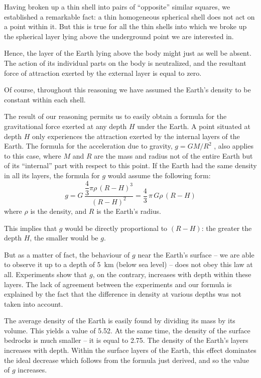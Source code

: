 Having broken up a thin shell into pairs of ``opposite''
similar squares, we established a remarkable fact: a thin
homogeneous spherical shell does not act on a point
within it. But this is true for all the thin shells into which
we broke up the spherical layer lying above the underground point we are interested in.

Hence, the layer of the Earth lying above the body
might just as well be absent. The action of its individual
parts on the body is neutralized, and the resultant force
of attraction exerted by the external layer is equal
to zero.

Of course, throughout this reasoning we have assumed
the Earth's density to be constant within each shell.

The result of our reasoning permits us to easily obtain
a formula for the gravitational force exerted at any
depth $H$ under the Earth. A point situated at depth $H$
only experiences the attraction exerted by the internal
layers of the Earth. The formula for the acceleration due
to gravity, $g = GM/R^{2}$ , also applies to this case, where $M$
and $R$ are the mass and radius not of the entire Earth
but of its ``internal'' part with respect to this point.
If the Earth had the same density in all its layers, the
formula for $g$ would assume the following form:
 \begin{equation*}%
g = G \, \dfrac{\dfrac{4}{3} \pi \rho \, (R - H)^{3}}{(R - H)^{2}} = \dfrac{4}{3} \, \pi \, G \rho \, (R - H)
 \end{equation*}
where $\rho$ is the density, and $R$ is the Earth's radius.

This implies that $g$ would be directly proportional to
$(R - H)$: the greater the depth $H$, the smaller would be $g$.

But as a matter of fact, the behaviour of $g$ near the
Earth's surface -- we are able to observe it up to a depth
of \SI{5}{\kilo\meter} (below sea level) -- does not obey this law at all. Experiments show that $g$, on the contrary, increases with
depth within these layers. The lack of agreement between
the experiments and our formula is explained by the fact
that the difference in density at various depths was not
taken into account.

The average density of the Earth is easily found by
dividing its mass by its volume. This yields a value of
5.52. At the same time, the density of the surface bedrocks is much smaller -- it is equal to 2.75. The density
of the Earth's layers increases with depth. Within the
surface layers of the Earth, this effect dominates the
ideal decrease which follows from the formula just derived, and so the value of $g$ increases.

